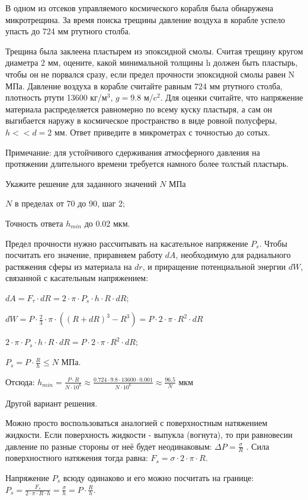 
В одном из отсеков управляемого космического
корабля была обнаружена микротрещина. За время поиска трещины давление воздуха в
корабле успело упасть до 724 мм ртутного столба. 

Трещина была заклеена
пластырем из эпоксидной смолы. Считая трещину кругом диаметра 2 мм, оцените,
какой минимальной толщины h
должен быть пластырь, чтобы он не порвался сразу, если предел прочности
эпоксидной смолы равен N МПа. Давление воздуха в корабле считайте равным 724 мм ртутного столба, плотность ртути 13600 кг/м$^3$, $g=9.8$ м/c$^2$. Для оценки считайте, что напряжение материала распределяется равномерно по всему
куску пластыря, а сам он выгибается наружу в космическое пространство в виде
ровной полусферы,  $h << d = 2$ мм. Ответ приведите в микрометрах с точностью до сотых.

Примечание:
для устойчивого сдерживания атмосферного давления на протяжении длительного
времени требуется намного более толстый пластырь.

Укажите решение для заданного значений $N$ МПа

\paramSection

$N$ в пределах от 70 до 90, шаг 2;         

Точность ответа  $h_{min}$  до  0.02 мкм.

\solutionSection

Предел прочности нужно рассчитывать на касательное напряжение $P_s$. Чтобы посчитать его значение, 
приравняем работу $dA$, необходимую для радиального растяжения сферы из материала на $dr$, и приращение 
потенциальной энергии $dW$, связанной с касательным напряжением:

$dA=F_{\tau} \cdot dR=2 \cdot \pi \cdot P_s \cdot h \cdot R \cdot dR$; 

$dW=P \cdot \frac{2}{3} \cdot \pi \cdot ((R+dR)^3-R^3 )=P \cdot 2 \cdot \pi \cdot R^2 \cdot dR$ 

$2 \cdot \pi \cdot P_s \cdot h \cdot R \cdot dR=P \cdot 2 \cdot \pi \cdot R^2 \cdot dR$; 

$ P_s=P \cdot \frac{R}{h} \leq N$ МПа.  

Отсюда:
$h_{min}=\frac{P \cdot R}{N \cdot 10^6} \approx \frac{0.724 \cdot 9.8 \cdot 13600 \cdot 0.001}{N \cdot 10^6} \approx \frac{96.5}{N}$  мкм

Другой вариант решения.

Можно просто воспользоваться аналогией с поверхностным натяжением жидкости. 
Если поверхность жидкости - выпукла (вогнута), то при равновесии давление по разные стороны от 
неё будет неодинаковым:  $\Delta P= \frac{\sigma}{R}$ . Сила поверхностного натяжения тогда равна: 
$F_s= \sigma  \cdot 2 \cdot \pi \cdot R$.

Напряжение $P_s$ всюду одинаково и его можно посчитать на границе:  
$P_s=\frac{F_s}{2 \cdot \pi \cdot R \cdot h}= \frac{\sigma}{h}=P \cdot \frac{R}{h}$.


